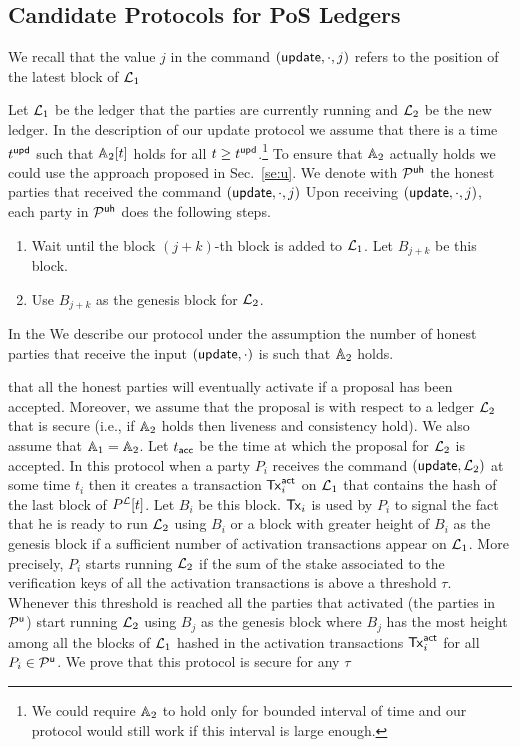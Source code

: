 \subsection{Candidate Protocols for PoS Ledgers}
We recall that the value $j$ in the command $(\mathsf{update},\cdot, j)$ refers to the position of the latest block of $\mathcal{L}_1$ 

Let $\mathcal{L}_1$ be the ledger that the parties are currently running and $\mathcal{L}_2$ be the new ledger.
In the description of our update protocol we assume that there is a time $t^{\mathsf{upd}}$ such that $\mathbb{A}_2[t]$ holds for all $t\geq t^{\mathsf{upd}}$.\footnote{We could require $\mathbb{A}_2$ to
hold only for bounded interval of time and our protocol would still work if this interval is large enough.} To ensure that $\mathbb{A}_2$ actually holds we could use
the approach proposed in Sec.~\ref{se:u}. 
We denote with $\mathcal{P}^\mathsf{uh}$ the honest parties that received the command $(\mathsf{update},\cdot, j)$ Upon receiving $(\mathsf{update},\cdot, j)$, each party in $\mathcal{P}^\mathsf{uh}$ does the following steps.
\begin{enumerate}
	\item Wait until the block $(j+k)$-th block is added to $\mathcal{L}_1$. Let $B_{j+k}$ be this block.
	\item Use $B_{j+k}$ as the genesis block for $\mathcal{L}_2$.
\end{enumerate}







In the 
We describe our protocol under the assumption the number of honest parties that receive the input $(\mathsf{update},\cdot)$ is such that $\mathbb{A}_2$ holds.

 that all the honest parties will eventually activate if a proposal has been accepted. Moreover, we assume that the proposal is with
respect to a ledger $\mathcal{L}_2$ that is secure (i.e., if $\mathbb{A}_2$ holds then liveness and consistency hold). We also assume that $\mathbb{A}_1=\mathbb{A}_2$. Let $t_{\mathsf{acc}}$ be the time at which the proposal 
for $\mathcal{L}_2$ is accepted.
In this protocol when a party $P_i$ receives the command $(\mathsf{update}, \mathcal{L}_2)$ at some time $t_i$ then it creates a transaction $\mathsf{Tx}^\mathsf{act}_i$ on $\mathcal{L}_1$ that contains the hash of the last block of $P^{\mathcal{L}}[t]$. Let $B_i$ be this block. $\mathsf{Tx}_i$ is used by $P_i$ to signal the fact that he is ready to run $\mathcal{L}_2$ using $B_i$ or a block
with greater height of $B_i$ as the genesis block if a sufficient number of activation transactions appear on $\mathcal{L}_1$. 
More precisely, $P_i$ starts running $\mathcal{L}_2$ if the sum of the stake associated to the
verification keys of all the activation transactions is above a threshold $\tau$. Whenever this threshold is reached all the parties that activated (the parties in $\mathcal{P}^\mathsf{u}$)
start running $\mathcal{L}_2$ using $B_j$ as the genesis block where $B_j$ has the most height among all the blocks of $\mathcal{L}_1$ hashed in the activation transactions $\mathsf{Tx}^\mathsf{act}_i$
for all $P_i\in\mathcal{P}^\mathsf{u}$.
We prove that this protocol is secure for any $\tau$ 

